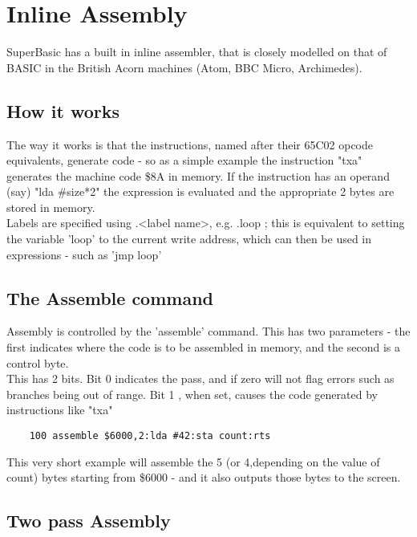 \chapter{Inline Assembly}

SuperBasic has a built in inline assembler, that is closely modelled on that of BASIC in the British Acorn machines (Atom, BBC Micro, Archimedes).\\

\section{How it works}

The way it works is that the instructions, named after their 65C02 opcode equivalents, generate code - so as a simple example the instruction "txa" generates the machine code \$8A in memory. If the instruction has an operand (say) "lda \#size*2" the expression is evaluated and the appropriate 2 bytes are stored in memory. \\

Labels are specified using .<label name>, e.g. .loop ; this is equivalent to setting the variable 'loop' to the current write address, which can then be used in expressions - such as 'jmp loop'

\section {The Assemble command}

Assembly is controlled by the 'assemble' command. This has two parameters - the first indicates where the code is to be assembled in memory, and the second is a control byte. \\

This has 2 bits.  Bit 0 indicates the pass, and if zero will not flag errors such as branches being out of range. Bit 1 , when set, causes the code generated by instructions like "txa"

\begin{verbatim}
	100 assemble $6000,2:lda #42:sta count:rts
\end{verbatim}

This very short example will assemble the 5 (or 4,depending on the value of count) bytes starting from \$6000 - and it also outputs those bytes to the screen. \\

\section {Two pass Assembly}

